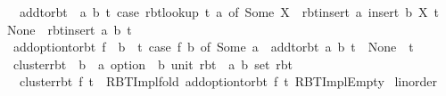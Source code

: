 \begin{isabellebody}
\ \ {\isachardoublequoteopen}add{\isacharunderscore}{\kern0pt}to{\isacharunderscore}{\kern0pt}rbt\ {\isacharequal}{\kern0pt}\ {\isacharparenleft}{\kern0pt}{\isasymlambda}{\isacharparenleft}{\kern0pt}a{\isacharcomma}{\kern0pt}\ b{\isacharparenright}{\kern0pt}\ t{\isachardot}{\kern0pt}\ case\ rbt{\isacharunderscore}{\kern0pt}lookup\ t\ a\ of\ Some\ X\ {\isasymRightarrow}\ rbt{\isacharunderscore}{\kern0pt}insert\ a\ {\isacharparenleft}{\kern0pt}insert\ b\ X{\isacharparenright}{\kern0pt}\ t\ {\isacharbar}{\kern0pt}\ None\ {\isasymRightarrow}\ rbt{\isacharunderscore}{\kern0pt}insert\ a\ {\isacharbraceleft}{\kern0pt}b{\isacharbraceright}{\kern0pt}\ t{\isacharparenright}{\kern0pt}{\isachardoublequoteclose}\isanewline
\isanewline
{}\isamarkupfalse%
\ {\isachardoublequoteopen}add{\isacharunderscore}{\kern0pt}option{\isacharunderscore}{\kern0pt}to{\isacharunderscore}{\kern0pt}rbt\ f\ {\isasymequiv}\ {\isacharparenleft}{\kern0pt}{\isasymlambda}b\ {\isacharunderscore}{\kern0pt}\ t{\isachardot}{\kern0pt}\ case\ f\ b\ of\ Some\ a\ {\isasymRightarrow}\ add{\isacharunderscore}{\kern0pt}to{\isacharunderscore}{\kern0pt}rbt\ {\isacharparenleft}{\kern0pt}a{\isacharcomma}{\kern0pt}\ b{\isacharparenright}{\kern0pt}\ t\ {\isacharbar}{\kern0pt}\ None\ {\isasymRightarrow}\ t{\isacharparenright}{\kern0pt}{\isachardoublequoteclose}\isanewline
\isanewline
{}\isamarkupfalse%
\ cluster{\isacharunderscore}{\kern0pt}rbt\ {\isacharcolon}{\kern0pt}{\isacharcolon}{\kern0pt}\ {\isachardoublequoteopen}{\isacharparenleft}{\kern0pt}{\isacharprime}{\kern0pt}b\ {\isasymRightarrow}\ {\isacharprime}{\kern0pt}a\ option{\isacharparenright}{\kern0pt}\ {\isasymRightarrow}\ {\isacharparenleft}{\kern0pt}{\isacharprime}{\kern0pt}b{\isacharcomma}{\kern0pt}\ unit{\isacharparenright}{\kern0pt}\ rbt\ {\isasymRightarrow}\ {\isacharparenleft}{\kern0pt}{\isacharprime}{\kern0pt}a{\isacharcomma}{\kern0pt}\ {\isacharprime}{\kern0pt}b\ set{\isacharparenright}{\kern0pt}\ rbt{\isachardoublequoteclose}\ \isanewline
\ \ {\isachardoublequoteopen}cluster{\isacharunderscore}{\kern0pt}rbt\ f\ t\ {\isacharequal}{\kern0pt}\ RBT{\isacharunderscore}{\kern0pt}Impl{\isachardot}{\kern0pt}fold\ {\isacharparenleft}{\kern0pt}add{\isacharunderscore}{\kern0pt}option{\isacharunderscore}{\kern0pt}to{\isacharunderscore}{\kern0pt}rbt\ f{\isacharparenright}{\kern0pt}\ t\ RBT{\isacharunderscore}{\kern0pt}Impl{\isachardot}{\kern0pt}Empty{\isachardoublequoteclose}\isanewline
\isanewline
{}\isamarkupfalse%
\isanewline
\isanewline
{}\isamarkupfalse%
\ linorder\isanewline

\end{isabellebody}
